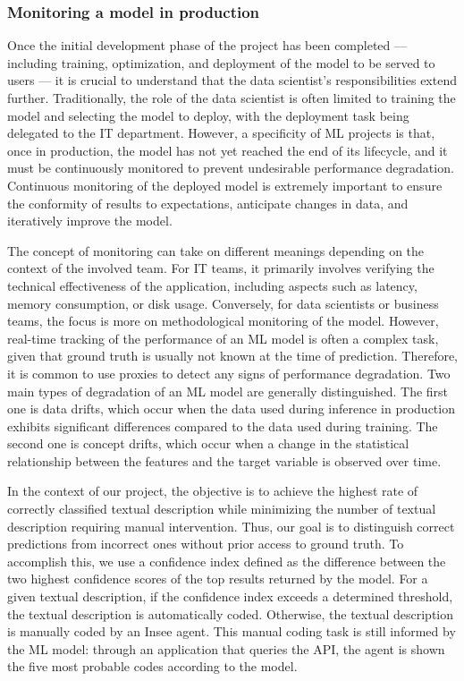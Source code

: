 \documentclass[graybox]{svmult}
\begin{document}
\subsubsection{Monitoring a model in production}
\label{subsubsec:monitoring}

Once the initial development phase of the project has been completed — including training, optimization, and deployment of the model to be served to users — it is crucial to understand that the data scientist's responsibilities extend further. Traditionally, the role of the data scientist is often limited to training the model and selecting the model to deploy, with the deployment task being delegated to the IT department. However, a specificity of ML projects is that, once in production, the model has not yet reached the end of its lifecycle, and it must be continuously monitored to prevent undesirable performance degradation. Continuous monitoring of the deployed model is extremely important to ensure the conformity of results to expectations, anticipate changes in data, and iteratively improve the model.

The concept of monitoring can take on different meanings depending on the context of the involved team. For IT teams, it primarily involves verifying the technical effectiveness of the application, including aspects such as latency, memory consumption, or disk usage. Conversely, for data scientists or business teams, the focus is more on methodological monitoring of the model. However, real-time tracking of the performance of an ML model is often a complex task, given that ground truth is usually not known at the time of prediction. Therefore, it is common to use proxies to detect any signs of performance degradation. Two main types of degradation of an ML model are generally distinguished. The first one is data drifts, which occur when the data used during inference in production exhibits significant differences compared to the data used during training. The second one is concept drifts, which occur when a change in the statistical relationship between the features and the target variable is observed over time.

In the context of our project, the objective is to achieve the highest rate of correctly classified textual description while minimizing the number of textual description requiring manual intervention. Thus, our goal is to distinguish correct predictions from incorrect ones without prior access to ground truth. To accomplish this, we use a confidence index defined as the difference between the two highest confidence scores of the top results returned by the model. For a given textual description, if the confidence index exceeds a determined threshold, the textual description is automatically coded. Otherwise, the textual description is manually coded by an Insee agent. This manual coding task is still informed by the ML model: through an application that queries the API, the agent is shown the five most probable codes according to the model. 
\end{document}
